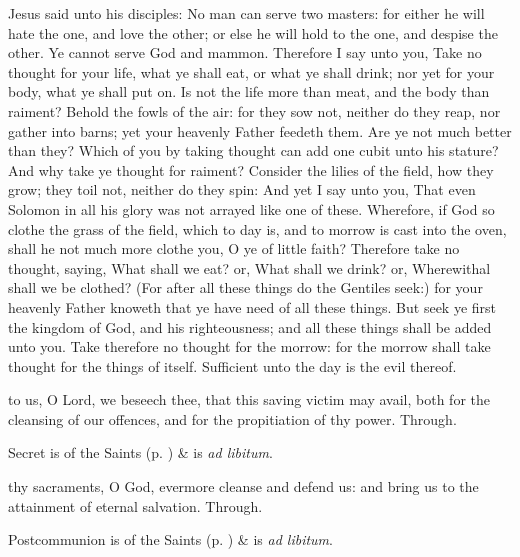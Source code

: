 
 Jesus said unto his disciples: No man can serve two masters: for either he will hate the one, and love the other; or else he will hold to the one, and despise the other. Ye cannot serve God and mammon. Therefore I say unto you, Take no thought for your life, what ye shall eat, or what ye shall drink; nor yet for your body, what ye shall put on. Is not the life more than meat, and the body than raiment? Behold the fowls of the air: for they sow not, neither do they reap, nor gather into barns; yet your heavenly Father feedeth them. Are ye not much better than they? Which of you by taking thought can add one cubit unto his stature? And why take ye thought for raiment? Consider the lilies of the field, how they grow; they toil not, neither do they spin: And yet I say unto you, That even Solomon in all his glory was not arrayed like one of these. Wherefore, if God so clothe the grass of the field, which to day is, and to morrow is cast into the oven, shall he not much more clothe you, O ye of little faith? Therefore take no thought, saying, What shall we eat? or, What shall we drink? or, Wherewithal shall we be clothed? (For after all these things do the Gentiles seek:) for your heavenly Father knoweth that ye have need of all these things. But seek ye first the kingdom of God, and his righteousness; and all these things shall be added unto you. Take therefore no thought for the morrow: for the morrow shall take thought for the things of itself. Sufficient unto the day is the evil thereof.


\secret
{} to us, O Lord, we beseech thee, that this saving victim may avail, both for the cleansing of our offences, and for the propitiation of thy power. Through.
\begin{rubric}
     Secret is of the Saints (p. \pageref{SPSaints}) \&  is \emph{ad libitum}.
\end{rubric}


\postcommunion
{} thy sacraments, O God, evermore cleanse and defend us: and bring us to the attainment of eternal salvation. Through.
\begin{rubric}
     Postcommunion is of the Saints (p. \pageref{SPSaints}) \&  is \emph{ad libitum}.
\end{rubric}

